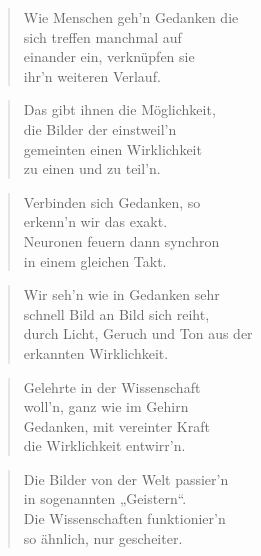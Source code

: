 \documentclass[10pt,a4paper]{article}
\begin{document}
\begin{paracol}{2}
\begin{verse}
Wie Menschen geh’n Gedanken die \\
sich treffen manchmal auf \\
einander ein, verknüpfen sie \\
ihr’n weiteren Verlauf. \\
\end{verse}

\begin{verse}
Das gibt ihnen die Möglichkeit, \\
die Bilder der einstweil’n \\
gemeinten einen Wirklichkeit \\
zu einen und zu teil’n. \\
\end{verse}

\begin{verse}
Verbinden sich Gedanken, so \\
erkenn’n wir das exakt. \\
Neuronen feuern dann synchron \\
in einem gleichen Takt. \\
\end{verse}

\begin{verse}
Wir seh’n wie in Gedanken sehr \\
schnell Bild an Bild sich reiht, \\
durch Licht, Geruch und Ton aus der \\
erkannten Wirklichkeit. \\
\end{verse}

\begin{verse}
Gelehrte in der Wissenschaft \\
woll’n, ganz wie im Gehirn \\
Gedanken, mit vereinter Kraft \\
die Wirklichkeit entwirr’n. \\
\end{verse}

\begin{verse}
Die Bilder von der Welt passier’n \\
in sogenannten „Geistern“. \\
Die Wissenschaften funktionier’n \\
so ähnlich, nur gescheiter. \\
\end{verse}


\end{paracol}
\end{document}
